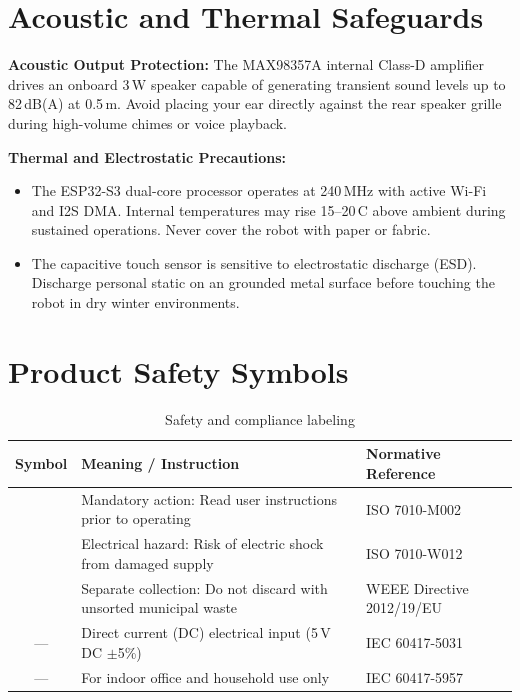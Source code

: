 \documentclass[11pt,a4paper,oneside]{report}
\newcommand{\hdr}[1]{\cellcolor{LightBlue}\textbf{#1}}
\newcommand{\elecsym}[1][0.55cm]{\begin{tikzpicture}[baseline=-0.1ex]
 \fill[WarnYellow,draw=black,line width=0.6pt,rounded corners=1pt] (0,0)--(#1,0)--(#1/2,#1*0.87)--cycle;
 \fill[black] (#1*0.55,#1*0.68)--(#1*0.33,#1*0.34)--(#1*0.48,#1*0.34)--(#1*0.40,#1*0.12)--(#1*0.68,#1*0.45)--(#1*0.52,#1*0.45)--cycle;
 \end{tikzpicture}}
\newcommand{\mandsym}[1][0.5cm]{\begin{tikzpicture}[baseline=-0.5ex]
 \fill[blue!70!black] (0,0) circle (#1/2);\node[white,font=\bfseries\small] at (0,0) {i};\end{tikzpicture}}
\newcommand{\weeesym}[1][0.5cm]{\begin{tikzpicture}[baseline=0pt,scale=#1/0.5cm]
 \draw[line width=0.6pt] (0.1,0.05) rectangle (0.4,0.32);\draw[line width=0.6pt] (0.05,0.32)--(0.45,0.32);
 \draw[line width=0.6pt] (0.2,0.32) arc(180:0:0.05);
 \draw[line width=0.8pt,red] (0,0)--(0.5,0.5);\draw[line width=0.8pt,red] (0,0.5)--(0.5,0);
 \fill (0,-0.12) rectangle (0.5,-0.04);\end{tikzpicture}}
\begin{document}
\section{Acoustic and Thermal Safeguards}
\begin{caution}
\textbf{Acoustic Output Protection:} The MAX98357A internal Class-D amplifier drives an onboard 3\,W speaker capable of generating transient sound levels up to 82\,dB(A) at 0.5\,m. Avoid placing your ear directly against the rear speaker grille during high-volume chimes or voice playback.
\end{caution}

\begin{notice}
\textbf{Thermal and Electrostatic Precautions:}
\begin{itemize}[leftmargin=*]
\item The ESP32-S3 dual-core processor operates at 240\,MHz with active Wi-Fi and I2S DMA. Internal temperatures may rise 15--20\,\textdegree C above ambient during sustained operations. Never cover the robot with paper or fabric.
\item The capacitive touch sensor is sensitive to electrostatic discharge (ESD). Discharge personal static on an grounded metal surface before touching the robot in dry winter environments.
\end{itemize}
\end{notice}

\section{Product Safety Symbols}
\begin{table}[H]\centering\small
\caption{Safety and compliance labeling}
\begin{tabularx}{\linewidth}{|c|X|l|}\hline
\hdr{Symbol} & \hdr{Meaning / Instruction} & \hdr{Normative Reference}\\ \hline
\mandsym & Mandatory action: Read user instructions prior to operating & ISO 7010-M002\\ \hline
\elecsym & Electrical hazard: Risk of electric shock from damaged supply & ISO 7010-W012\\ \hline
\weeesym & Separate collection: Do not discard with unsorted municipal waste & WEEE Directive 2012/19/EU\\ \hline
--- & Direct current (DC) electrical input (5\,V\,DC $\pm$5\%) & IEC 60417-5031\\ \hline
--- & For indoor office and household use only & IEC 60417-5957\\ \hline
\end{tabularx}
\end{table}
\end{document}
